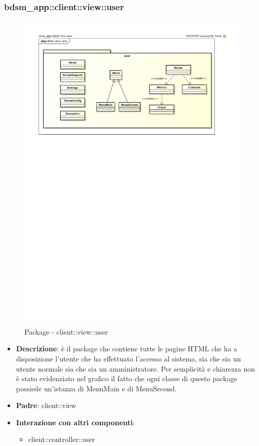 \subsubsection{bdsm\_app::client::view::user} %
\label{ssub:bdsm_app_client_view_user}
\begin{figure}[htbp]
	\centering
	\centerline{\includegraphics[scale=0.8]{./images/client_view_user.pdf}}
	\caption{Package - client::view::user}
\end{figure}

\begin{itemize}
	\item \textbf{Descrizione}: è il package che contiene tutte le pagine HTML che ha a disposizione l'utente che ha effettuato l'accesso al sistema, sia che sia un utente normale sia che sia un amministratore. \newline
	Per semplicità e chiarezza non è stato evidenziato nel grafico il fatto che ogni classe di questo package possiede un'istanza di MenuMain e di MenuSecond.
	\item \textbf{Padre}: client::view
	\item \textbf{Interazione con altri componenti}:
		\begin{itemize}
			\item client::controller::user
		\end{itemize}
\end{itemize}

